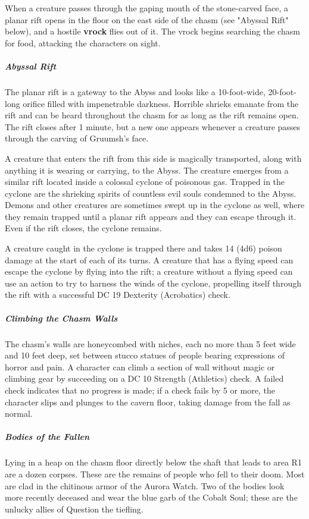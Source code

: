 \documentclass[10pt,a4paper,twoside,bg=print,twocolumn,openany,nodeprecatedcode]{dndbook}
\begin{document}
When a creature passes through the gaping mouth of the stone-carved face, a planar rift opens in the floor on the east side of the chasm (see "Abyssal Rift" below), and a hostile \textbf{vrock} flies out of it. The vrock begins searching the chasm for food, attacking the characters on sight.

\subparagraph{Abyssal Rift}
The planar rift is a gateway to the Abyss and looks like a 10-foot-wide, 20-foot-long orifice filled with impenetrable darkness. Horrible shrieks emanate from the rift and can be heard throughout the chasm for as long as the rift remains open. The rift closes after 1 minute, but a new one appears whenever a creature passes through the carving of Gruumsh's face.

A creature that enters the rift from this side is magically transported, along with anything it is wearing or carrying, to the Abyss. The creature emerges from a similar rift located inside a colossal cyclone of poisonous gas. Trapped in the cyclone are the shrieking spirits of countless evil souls condemned to the Abyss. Demons and other creatures are sometimes swept up in the cyclone as well, where they remain trapped until a planar rift appears and they can escape through it. Even if the rift closes, the cyclone remains.

A creature caught in the cyclone is trapped there and takes 14 (4d6) poison damage at the start of each of its turns. A creature that has a flying speed can escape the cyclone by flying into the rift; a creature without a flying speed can use an action to try to harness the winds of the cyclone, propelling itself through the rift with a successful DC 19 Dexterity (Acrobatics) check.

\subparagraph{Climbing the Chasm Walls}
The chasm's walls are honeycombed with niches, each no more than 5 feet wide and 10 feet deep, set between stucco statues of people bearing expressions of horror and pain. A character can climb a section of wall without magic or climbing gear by succeeding on a DC 10 Strength (Athletics) check. A failed check indicates that no progress is made; if a check fails by 5 or more, the character slips and plunges to the cavern floor, taking damage from the fall as normal.

\subparagraph{Bodies of the Fallen}
Lying in a heap on the chasm floor directly below the shaft that leads to area R1 are a dozen corpses. These are the remains of people who fell to their doom. Most are clad in the chitinous armor of the Aurora Watch. Two of the bodies look more recently deceased and wear the blue garb of the Cobalt Soul; these are the unlucky allies of Question the tiefling.
\end{document}
